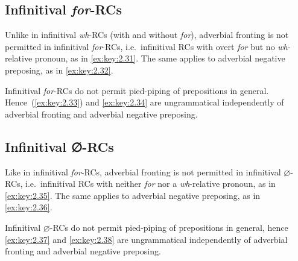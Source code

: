 \documentclass[output=paper]{langsci/langscibook}
\begin{document}
\subsection{Infinitival \emph{for}-RCs}

Unlike in infinitival \emph{wh}{-\glspl{RC} (with and without} \emph{for}), adverbial
fronting is not permitted in infinitival \emph{for}{-RCs, i.e.\ infinitival RCs
with overt} \emph{for} but no \emph{wh}{-relative pronoun}, as in \eqref{ex:key:2.31}. The
same applies to adverbial negative preposing, as in \eqref{ex:key:2.32}.

\ea\label{ex:key:2.31}
    \z
\z

\ea\label{ex:key:2.32}
    \z
\z
Infinitival \emph{for}-\glspl{RC} do not permit pied-piping of prepositions in
general. Hence~(\ref{ex:key:2.33}) and \eqref{ex:key:2.34} are ungrammatical independently of adverbial
fronting and adverbial negative preposing.

\label{ex:key:2.33}
\z

\label{ex:key:2.34}
\z

\subsection{Infinitival ∅-RCs}

Like in infinitival \emph{for}{-RCs, adverbial fronting is not permitted in
infinitival} $\varnothing${-RCs, i.e.\ infinitival \glspl{RC} with neither} \emph{for} nor
a \emph{wh}{-relative pronoun}, as in \eqref{ex:key:2.35}. The same applies to adverbial
negative preposing, as in \eqref{ex:key:2.36}.

\label{ex:key:2.35}
\z

\label{ex:key:2.36}
\z
Infinitival $\varnothing${-\glspl{RC} do not permit pied-pi}ping of prepositions in
general, hence \eqref{ex:key:2.37} and \eqref{ex:key:2.38} are ungrammatical independently of adverbial
fronting and adverbial negative preposing.
\end{document}
